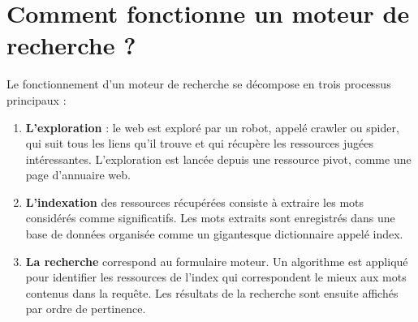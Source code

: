 \documentclass[a4paper, dvipsnames]{article}
\begin{document}
%
\section{Comment fonctionne un moteur de recherche ?}

Le fonctionnement d’un moteur de recherche se décompose en trois processus principaux :
\begin{enumerate}
  \item \textbf{L’exploration} : le web est exploré par un robot, appelé crawler ou spider, qui suit tous les liens qu’il trouve et qui récupère les ressources jugées intéressantes. L’exploration est lancée depuis une ressource pivot, comme une page d’annuaire web.
  \item \textbf{L’indexation} des ressources récupérées consiste à extraire les mots considérés comme significatifs. Les mots extraits sont enregistrés dans une base de données organisée comme un
    gigantesque dictionnaire appelé index.
  \item \textbf{La recherche} correspond au formulaire moteur. Un algorithme est appliqué pour identifier les ressources de l’index qui correspondent le mieux aux mots contenus dans la requête. Les résultats de la recherche sont ensuite affichés par ordre de pertinence.
\end{enumerate}

\medskip
\end{document}
